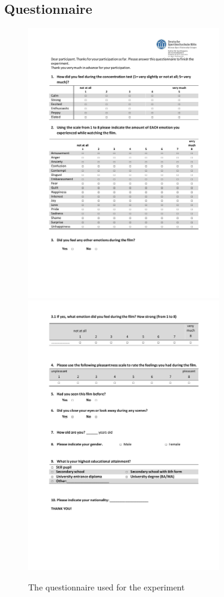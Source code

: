 \documentclass[	
	12pt, %
	a4paper, %
  abstracton
]{scrartcl}\usepackage[]{graphicx}\usepackage[]{color}
\begin{document}
\subsection{Questionnaire}




\begin{figure}
\includegraphics[width=0.75\textwidth, angle=90]{graphics/1_questionnaire_en.pdf}
\includegraphics[width=0.75\textwidth, angle=90]{graphics/2_questionnaire_en.pdf}
\caption{The questionnaire used for the experiment}
\end{figure}

\newpage
\end{document}
